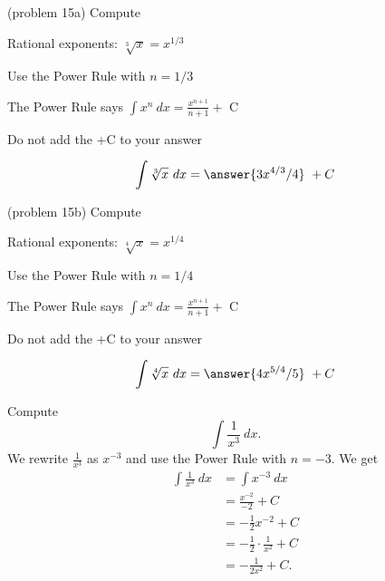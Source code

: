 \documentclass[handout]{ximera}
\begin{document}
\begin{problem}(problem 15a)
Compute 

\begin{hint}
Rational exponents: $\sqrt[3]x = x^{1/3}$
\end{hint}
\begin{hint}
Use the Power Rule with $n=1/3$
\end{hint}
\begin{hint}
The Power Rule says $\int x^n \ dx = \frac{x^{n+1}}{n+1} +$ C
\end{hint}
\begin{hint}
\begin{center}
Do not add the +C to your answer
\end{center}
\end{hint}

\[
\int \sqrt[3]x \ dx =
\answer{3x^{4/3} /4} \ + C
\]
\end{problem}


\begin{problem}(problem 15b)
Compute 

\begin{hint}
Rational exponents: $\sqrt[4]x = x^{1/4}$
\end{hint}
\begin{hint}
Use the Power Rule with $n=1/4$
\end{hint}
\begin{hint}
The Power Rule says $\int x^n \ dx = \frac{x^{n+1}}{n+1} +$ C
\end{hint}
\begin{hint}
\begin{center}
Do not add the +C to your answer
\end{center}
\end{hint}

\[
\int \sqrt[4]x \ dx =
\answer{4x^{5/4} /5} \ + C
\]
\end{problem}



\begin{example}[example 16]
Compute $$\int \frac{1}{x^3} \ dx.$$
We rewrite $\frac{1}{x^3}$ as $x^{-3}$ and use the Power Rule with $n= -3$.
We get
\begin{align*}
\int \frac{1}{x^3} \ dx &= \int x^{-3} \ dx \\
&= \frac{x^{-2}}{-2} + C\\ 
&= -\tfrac{1}{2}x^{-2} + C \\
&= -\tfrac{1}{2}\cdot\frac{1}{x^2} + C \\
&= -\frac{1}{2x^2} +C.
\end{align*}
\end{example}
\end{document}
